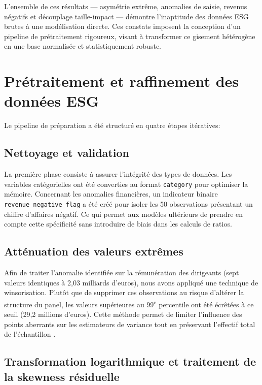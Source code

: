 L’ensemble de ces résultats — asymétrie extrême, anomalies de saisie, revenus négatifs et découplage taille-impact — démontre l'inaptitude des données ESG brutes à une modélisation directe. Ces constats imposent la conception d’un pipeline de prétraitement rigoureux, visant à transformer ce gisement hétérogène en une base normalisée et statistiquement robuste.

\section{Prétraitement et raffinement des données ESG}
Le pipeline de préparation a été structuré en quatre étapes itératives:

\subsection{Nettoyage et validation}
La première phase consiste à assurer l'intégrité des types de données. Les variables catégorielles ont été converties au format \texttt{category} pour optimiser la mémoire. Concernant les anomalies financières, un indicateur binaire \texttt{revenue\_negative\_flag} a été créé pour isoler les 50 observations présentant un chiffre d'affaires négatif. Ce qui permet aux modèles ultérieurs de prendre en compte cette spécificité sans introduire de biais dans les calculs de ratios.


\subsection{Atténuation des valeurs extrêmes}
Afin de traiter l'anomalie identifiée sur la rémunération des dirigeants (sept valeurs identiques à 2,03 milliards d'euros), nous avons appliqué une technique de winsorisation. Plutôt que de supprimer ces observations au risque d'altérer la structure du panel, les valeurs supérieures au 99\textsuperscript{e} percentile ont été écrêtées à ce seuil (29,2 millions d'euros). Cette méthode permet de limiter l'influence des points aberrants sur les estimateurs de variance tout en préservant l'effectif total de l'échantillon \cite{maronna2006}.

\subsection{Transformation logarithmique et traitement de la skewness résiduelle}

